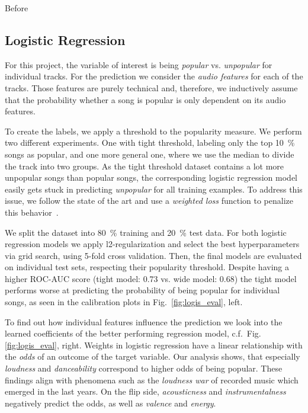 \documentclass{article}
\begin{document}
Before 

\subsection{Logistic Regression}
For this project, the variable of interest is being \textit{popular} vs. \textit{unpopular} for individual tracks.
For the prediction we consider the \textit{audio features} for each of the tracks. 
Those features are purely technical and, therefore, we inductively assume that the probability whether a song is popular is only dependent on its audio features. 

To create the labels, we apply a threshold to the popularity measure. 
We perform two different experiments. 
One with tight threshold, labeling only the top \SI{10}{\percent} songs as popular, and one more general one, where we use the median to divide the track into two groups.
As the tight threshold dataset contains a lot more unpopular songs than popular songs, the corresponding logistic regression model easily gets stuck in predicting \textit{unpopular} for all training examples. 
To address this issue, we follow the state of the art and use a \textit{weighted loss} function to penalize this behavior~\cite{haixiangLearningClassimbalancedData2017a}.

We split the dataset into \SI{80}{\percent} training and \SI{20}{\percent} test data.
For both logistic regression models we apply l2-regularization and select the best hyperparameters via grid search, using 5-fold cross validation. 
Then, the final models are evaluated on individual test sets, respecting their popularity threshold.
Despite having a higher ROC-AUC score (tight model: \num{0.73} vs. wide model: \num{0.68}) the tight model performs worse at predicting the probability of being popular for individual songs, as seen in the calibration plots in Fig.~\ref{fig:logis_eval}, left.

To find out how individual features influence the prediction we look into the learned coefficients of the better performing regression model, c.f.~Fig.\ref{fig:logis_eval}, right.
Weights in logistic regression have a linear relationship with the \textit{odds} of an outcome of the target variable.
Our analysis shows, that especially \textit{loudness} and \textit{danceability} correspond to higher odds of being popular.
These findings align with phenomena such as the \textit{loudness war}\cite{vickers2010loudness} of recorded music which emerged in the last years.
On the flip side, \emph{acousticness} and \emph{instrumentalness} negatively predict the odds, as well as \emph{valence} and \emph{energy}.
\end{document}
